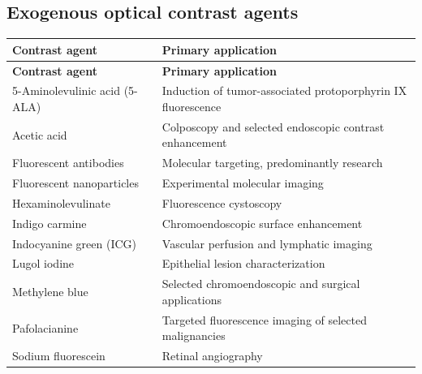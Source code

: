 \subsection{Exogenous optical contrast agents}
\begin{longtable}{@{}p{}p{}@{}}
\toprule
\textbf{Contrast agent} & \textbf{Primary application} \\
\midrule
\endfirsthead
\toprule
\textbf{Contrast agent} & \textbf{Primary application} \\
\midrule
\endhead
5-Aminolevulinic acid (5-ALA) & Induction of tumor-associated protoporphyrin IX fluorescence \\
Acetic acid & Colposcopy and selected endoscopic contrast enhancement \\
Fluorescent antibodies & Molecular targeting, predominantly research \\
Fluorescent nanoparticles & Experimental molecular imaging \\
Hexaminolevulinate & Fluorescence cystoscopy \\
Indigo carmine & Chromoendoscopic surface enhancement \\
Indocyanine green (ICG) & Vascular perfusion and lymphatic imaging \\
Lugol iodine & Epithelial lesion characterization \\
Methylene blue & Selected chromoendoscopic and surgical applications \\
Pafolacianine & Targeted fluorescence imaging of selected malignancies \\
Sodium fluorescein & Retinal angiography \\
\bottomrule
\end{longtable}

